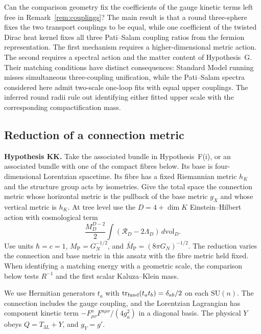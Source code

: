 \documentclass[aps,pra,onecolumn,superscriptaddress,nofootinbib,10pt]{revtex4-2}
\theoremstyle{definition}
\theoremstyle{remark}
\newcommand{\SU}{\mathrm{SU}}
\begin{document}
Can the comparison geometry fix the coefficients of the gauge kinetic
terms left free in Remark~\ref{rem:couplings}? The main result is that a
round three-sphere fixes the two transport couplings to be equal, while
one coefficient of the twisted Dirac heat kernel fixes all three
Pati--Salam coupling ratios from the fermion representation. The first
mechanism requires a higher-dimensional metric action. The second
requires a spectral action and the matter content of Hypothesis~G.
Their matching conditions have distinct consequences: Standard Model
running misses simultaneous three-coupling unification, while the
Pati--Salam spectra considered here admit two-scale one-loop
fits with equal upper couplings. The inferred round radii
rule out identifying either fitted upper scale with the
corresponding compactification mass.

\subsection{Reduction of a connection metric}

\smallskip\noindent\textbf{Hypothesis KK.}  Take the associated bundle in Hypothesis~F(i), or an associated bundle
with one of the compact fibres below. Its base is four-dimensional
Lorentzian spacetime. Its fibre has a fixed Riemannian metric $h_K$ and
the structure group acts by isometries. Give the total space the connection
metric whose horizontal metric is the pullback of the base metric $g_X$
and whose vertical metric is $h_K$. At tree level use the
$D=4+\dim K$ Einstein--Hilbert action with cosmological term
\[
 \frac{M_D^{D-2}}{2}\int(\mathcal R_D-2\Lambda_D)\,d\mathrm{vol}_D.
\]
Use units $\hbar=c=1$, $M_{\mathrm P}=G_N^{-1/2}$, and
$\bar M_{\mathrm P}=(8\pi G_N)^{-1/2}$. The reduction varies the
connection and base metric in this ansatz with the fibre metric held
fixed. When identifying a matching energy with a geometric scale, the
comparison below tests $R^{-1}$ and the first scalar Kaluza--Klein mass.


We use Hermitian generators $t_a$ with
$\operatorname{tr}_{\rm fund}(t_at_b)=\delta_{ab}/2$ on each
$\SU(n)$. The connection includes the gauge coupling, and
the Lorentzian Lagrangian has component kinetic term
$-F^a_{\mu\nu}F^{a\mu\nu}/(4g_a^2)$ in a diagonal basis.
The physical $Y$ obeys $Q=T_{3L}+Y$, and $g_Y=g'$.
\end{document}
